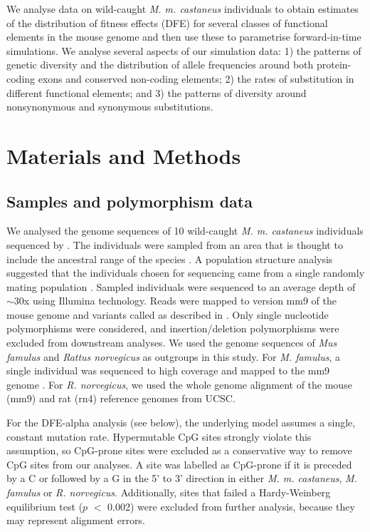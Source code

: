 	We analyse data on wild-caught \textit{M. m. castaneus} individuals to obtain estimates of the distribution of fitness effects (DFE) for several classes of functional elements in the mouse genome and then use these to parametrise forward-in-time simulations. We analyse several aspects of our simulation data: 1) the patterns of genetic diversity and the distribution of allele frequencies around both protein-coding exons and conserved non-coding elements; 2) the rates of substitution in different functional elements; and 3) the patterns of diversity around nonsynonymous and synonymous substitutions.
\section{Materials and Methods}

\subsection{Samples and polymorphism data}
 
	We analysed the genome sequences of 10 wild-caught \textit{M. m. castaneus} individuals sequenced by \cite{RN122}. The individuals were sampled from an area that is thought to include the ancestral range of the species \citep{RN233}. A population structure analysis suggested that the individuals chosen for sequencing came from a single randomly mating population \citep{RN158}. Sampled individuals were sequenced to an average depth of $\sim$30x using Illumina technology. Reads were mapped to version mm9 of the mouse genome and variants called as described in \cite{RN122}. Only single nucleotide polymorphisms were considered, and insertion/deletion polymorphisms were excluded from downstream analyses. We used the genome sequences of \textit{Mus famulus} and \textit{Rattus norvegicus} as outgroups in this study. For \textit{M. famulus}, a single individual was sequenced to high coverage and mapped to the mm9 genome \citep{RN122}. For \textit{R. norvegicus}, we used the whole genome alignment of the mouse (mm9) and rat (rn4) reference genomes from UCSC. 

	For the DFE-alpha analysis (see below), the underlying model assumes a single, constant mutation rate. Hypermutable CpG sites strongly violate this assumption, so CpG-prone sites were excluded as a conservative way to remove CpG sites from our analyses. A site was labelled as CpG-prone if it is preceded by a C or followed by a G in the 5' to 3' direction in either \textit{M. m. castaneus}, \textit{M. famulus} or \textit{R. norvegicus}. Additionally, sites that failed a Hardy-Weinberg equilibrium test ($p$ $<$ 0.002) were excluded from further analysis, because they may represent alignment errors.
 
